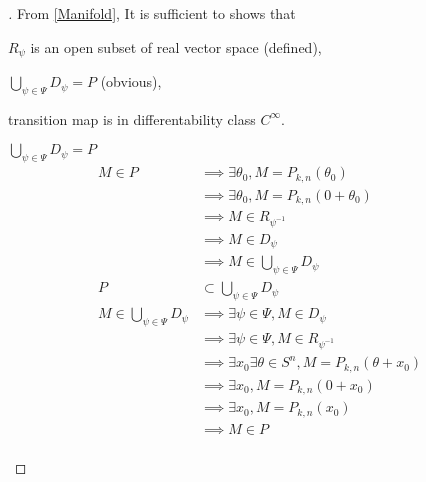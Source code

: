 \documentclass[../main.tex]{subfiles}
\begin{document}
\begin{proof}[]
    From \cref{Manifold}, It is sufficient to shows that
    \begin{APAenumerate}
        \item $R_\psi$ is an open subset of real vector space (defined),
        \item $\bigcup_{\psi\in\Psi} D_\psi = P$ (obvious),
        \item transition map is in differentability class $C^\infty$.
    \end{APAenumerate}
    \begin{subproof}{$\bigcup_{\psi\in\Psi} D_\psi = P$}
        \begin{align*}
            M \in P
                                         & \implies \exists \theta_0, M=P_{k,n}\left(\theta_0\right)                  \\
                                         & \implies \exists \theta_0, M=P_{k,n}\left(0 + \theta_0\right)              \\
                                         & \implies M\in R_{\psi^{-1}}                                                \\
                                         & \implies M\in D_{\psi}                                                     \\
                                         & \implies M\in \bigcup_{\psi\in\Psi} D_\psi                                 \\
            P                            & \subset\bigcup_{\psi\in\Psi}D_\psi                                         \\
            M\in \bigcup_{\psi\in\Psi} D_\psi
                                         & \implies \exists \psi\in\Psi, M\in D_\psi                                  \\
                                         & \implies \exists \psi\in\Psi, M\in R_{\psi^{-1}}                           \\
                                         & \implies \exists x_0\exists\theta\in S^n, M=P_{k,n}\left(\theta+x_0\right) \\
                                         & \implies \exists x_0, M=P_{k,n}\left(0+x_0\right)                          \\
                                         & \implies \exists x_0, M=P_{k,n}\left(x_0\right)                            \\
                                         & \implies M \in P                                                           \\

\end{align*}
\end{subproof}
\end{proof}
\end{document}
